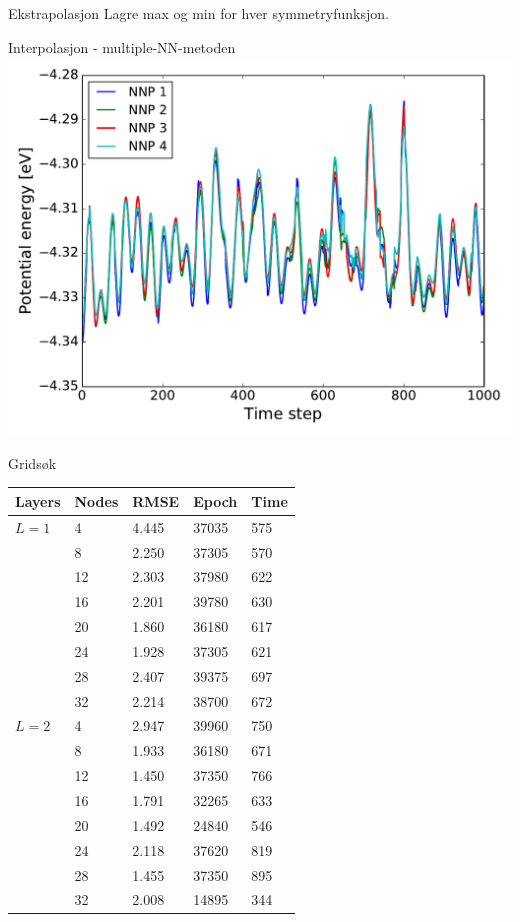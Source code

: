 \documentclass{beamer}
\begin{document}
\begin{frame}

\begin{block}{Ekstrapolasjon}
 Lagre max og min for hver symmetryfunksjon. 
\end{block}

\begin{block}{Interpolasjon - multiple-NN-metoden}
 \centering
 \includegraphics[width = 0.7\linewidth]{../Figures/Results/multipleNNP.pdf}
\end{block}

\end{frame}


\begin{frame}{Gridsøk}
 
\renewcommand{\arraystretch}{0.9}
\begin{table} 
\centering
  \begin{tabular*}{10cm}{l @{\extracolsep{\fill}} llll}
    \toprule
    Layers & Nodes & RMSE & Epoch & Time \\ 
    \hline
    $L=1$ & 4  & 4.445 & 37035 & 575 \\
	  & 8  & 2.250 & 37305 & 570 \\
	  & 12 & 2.303 & 37980 & 622 \\
	  & 16 & 2.201 & 39780 & 630 \\
	  & 20 & 1.860 & 36180 & 617 \\ 
	  & 24 & 1.928 & 37305 & 621 \\
	  & 28 & 2.407 & 39375 & 697 \\
	  & 32 & 2.214 & 38700 & 672 \\
    $L=2$ & 4  & 2.947 & 39960 & 750 \\
	  & 8  & 1.933 & 36180 & 671 \\
	  & 12 & 1.450 & 37350 & 766 \\
	  & 16 & 1.791 & 32265 & 633 \\
	  & 20 & 1.492 & 24840 & 546 \\
	  & 24 & 2.118 & 37620 & 819 \\
	  & 28 & 1.455 & 37350 & 895 \\
	  & 32 & 2.008 & 14895 & 344 \\
    \bottomrule
    \end{tabular*} 
\end{table}

\end{frame}
\end{document}

